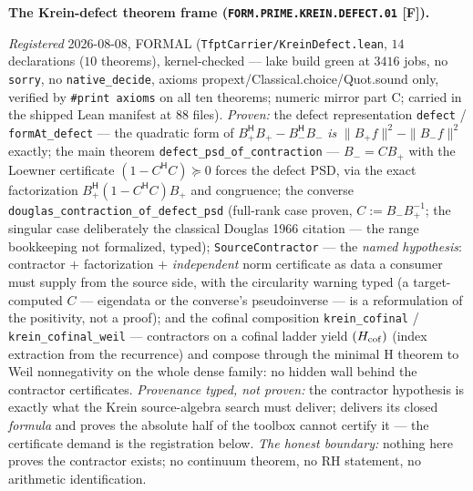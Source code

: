 \par\smallskip\noindent\textbf{The Krein-defect theorem frame
(\texttt{FORM.PRIME.\allowbreak KREIN.\allowbreak DEFECT.01}
[F]).}
{\sloppy
\emph{Registered} 2026-08-08, FORMAL
(\texttt{TfptCarrier/KreinDefect.lean}, $14$ declarations ($10$
theorems), kernel-checked --- lake build green at $3416$ jobs,
no \texttt{sorry}, no \texttt{native\_decide}, axioms
propext/Classical.choice/Quot.sound only, verified by
\texttt{\#print axioms} on all ten theorems; numeric mirror
 part C; carried in the
shipped Lean manifest at $88$ files).  \emph{Proven:} the
defect representation \texttt{defect} / \texttt{formAt\_defect}
--- the quadratic form of $B_+^{\mathsf H}B_+ -
B_-^{\mathsf H}B_-$ \emph{is} $\|B_+f\|^2 - \|B_-f\|^2$
exactly; the main theorem \texttt{defect\_psd\_of\_contraction}
--- $B_- = CB_+$ with the Loewner certificate $(1 -
C^{\mathsf H}C) \succeq 0$ forces the defect PSD, via the exact
factorization $B_+^{\mathsf H}(1 - C^{\mathsf H}C)B_+$ and
congruence; the converse
\texttt{douglas\_contraction\_of\_defect\_psd} (full-rank case
proven, $C := B_-B_+^{-1}$; the singular case deliberately the
classical Douglas 1966 citation --- the range bookkeeping not
formalized, typed); \texttt{SourceContractor} --- the
\emph{named hypothesis}: contractor $+$ factorization $+$
\emph{independent} norm certificate as data a consumer must
supply from the source side, with the circularity warning typed
(a target-computed $C$ --- eigendata or the converse's
pseudoinverse --- is a reformulation of the positivity, not a
proof); and the cofinal composition \texttt{krein\_cofinal} /
\texttt{krein\_cofinal\_weil} --- contractors on a cofinal
ladder yield $(H_{\rm cof})$ (index extraction from the
recurrence) and compose through the minimal H theorem to Weil
nonnegativity on the whole dense family: no hidden wall behind
the contractor certificates.  \emph{Provenance typed, not
proven:} the contractor hypothesis is exactly what the Krein
source-algebra search must deliver;
 delivers its closed
\emph{formula} and proves the absolute half of the toolbox
cannot certify it --- the certificate demand is the
registration below.  \emph{The honest boundary:} nothing here
proves the contractor exists; no continuum theorem, no RH
statement, no arithmetic identification.\par}


